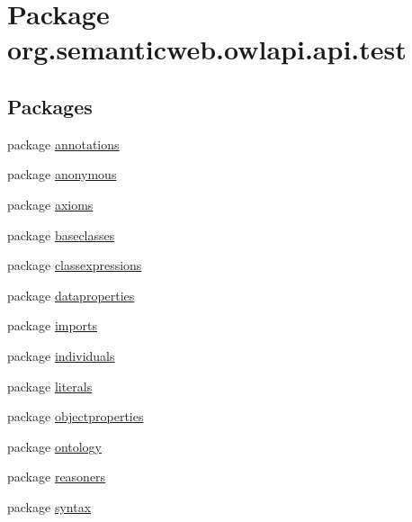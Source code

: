 \hypertarget{namespaceorg_1_1semanticweb_1_1owlapi_1_1api_1_1test}{\section{Package org.\-semanticweb.\-owlapi.\-api.\-test}
\label{namespaceorg_1_1semanticweb_1_1owlapi_1_1api_1_1test}
}
\subsection*{Packages}
\begin{DoxyCompactItemize}
\item 
package \hyperlink{namespaceorg_1_1semanticweb_1_1owlapi_1_1api_1_1test_1_1annotations}{annotations}
\item 
package \hyperlink{namespaceorg_1_1semanticweb_1_1owlapi_1_1api_1_1test_1_1anonymous}{anonymous}
\item 
package \hyperlink{namespaceorg_1_1semanticweb_1_1owlapi_1_1api_1_1test_1_1axioms}{axioms}
\item 
package \hyperlink{namespaceorg_1_1semanticweb_1_1owlapi_1_1api_1_1test_1_1baseclasses}{baseclasses}
\item 
package \hyperlink{namespaceorg_1_1semanticweb_1_1owlapi_1_1api_1_1test_1_1classexpressions}{classexpressions}
\item 
package \hyperlink{namespaceorg_1_1semanticweb_1_1owlapi_1_1api_1_1test_1_1dataproperties}{dataproperties}
\item 
package \hyperlink{namespaceorg_1_1semanticweb_1_1owlapi_1_1api_1_1test_1_1imports}{imports}
\item 
package \hyperlink{namespaceorg_1_1semanticweb_1_1owlapi_1_1api_1_1test_1_1individuals}{individuals}
\item 
package \hyperlink{namespaceorg_1_1semanticweb_1_1owlapi_1_1api_1_1test_1_1literals}{literals}
\item 
package \hyperlink{namespaceorg_1_1semanticweb_1_1owlapi_1_1api_1_1test_1_1objectproperties}{objectproperties}
\item 
package \hyperlink{namespaceorg_1_1semanticweb_1_1owlapi_1_1api_1_1test_1_1ontology}{ontology}
\item 
package \hyperlink{namespaceorg_1_1semanticweb_1_1owlapi_1_1api_1_1test_1_1reasoners}{reasoners}
\item 
package \hyperlink{namespaceorg_1_1semanticweb_1_1owlapi_1_1api_1_1test_1_1syntax}{syntax}
\end{DoxyCompactItemize}
